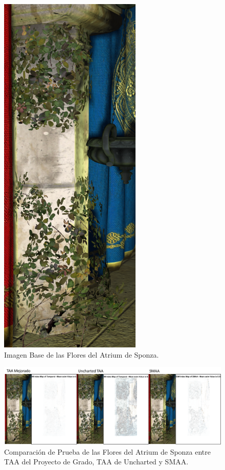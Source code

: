 \documentclass[pregrado]{tesis-usb} %
\begin{document}
\begin{figure}[!htb]
	\centering
	\includegraphics[scale=0.2]{images/results/sponza_flowers_sobel_ground_truth.png}
	\caption{Imagen Base de las Flores del Atrium de Sponza.}\label{fig:sponza_flowers_truth}
\end{figure}

\begin{figure}[!htb]
	\centering
	\includegraphics[scale=0.3]{images/results/sponza_flowers.png}
	\caption{Comparación de Prueba de las Flores del Atrium de Sponza entre TAA del Proyecto de Grado, TAA de Uncharted y SMAA.}\label{fig:sponza_flowers_render}
\end{figure}
\end{document}
